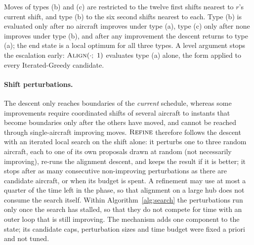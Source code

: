 Moves of types (b) and (c) are restricted to the twelve first shifts
nearest to $r$'s current shift, and type (b) to the six second shifts
nearest to each.  Type (b) is evaluated only after no aircraft improves
under type (a), type (c) only after none improves under type (b), and
after any improvement the descent returns to type (a); the end state is
a local optimum for all three types.  A level argument stops the
escalation early: $\textsc{Align}(\cdot;\ 1)$ evaluates type (a) alone,
the form applied to every Iterated-Greedy candidate.

\paragraph{Shift perturbations.}
The descent only reaches boundaries of the \emph{current} schedule,
whereas some improvements require coordinated shifts of several aircraft
to instants that become boundaries only after the others have moved, and
cannot be reached through single-aircraft improving moves.
$\textsc{Refine}$ therefore follows the descent with an iterated local
search on the shift alone: it perturbs one to three random aircraft,
each to one of its own proposals drawn at random (not necessarily
improving), re-runs the alignment descent, and keeps the result if it is
better; it stops after as many consecutive non-improving perturbations
as there are candidate aircraft, or when its budget is spent.  A
refinement may use at most a quarter of the time left in the phase, so
that alignment on a large hub does not consume the search itself.
Within Algorithm~\ref{alg:search} the perturbations run only once the
search has stalled, so that they do not compete for time with an outer
loop that is still improving.  The mechanism adds one component to the
state; its candidate caps, perturbation sizes and time budget were fixed
a priori and not tuned.

